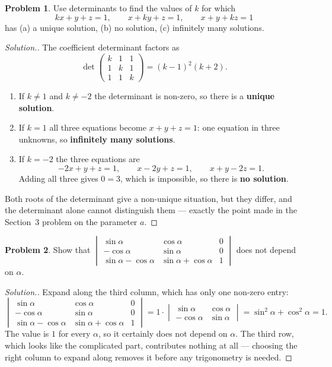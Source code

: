 \documentclass[11pt,a4paper]{article}
\theoremstyle{definition}
\newtheorem{problemx}{Problem}[section]
\newenvironment{problem}{\begin{problemx}}{\end{problemx}}
\newenvironment{solution}
  {\renewcommand{\qedsymbol}{}\begin{proof}[\textit{Solution}.]}
  {\end{proof}}
\begin{document}
\begin{problem}
Use determinants to find the values of $k$ for which
$$kx+y+z=1,\qquad x+ky+z=1,\qquad x+y+kz=1$$
has (a) a unique solution, (b) no solution, (c) infinitely many solutions.
\end{problem}
\begin{solution}
The coefficient determinant factors as
$$\det\begin{pmatrix}k&1&1\\1&k&1\\1&1&k\end{pmatrix}=(k-1)^2(k+2).$$
\begin{enumerate}
\item[(a)] If $k\neq 1$ and $k\neq -2$ the determinant is non-zero, so there is
a \textbf{unique solution}.
\item[(c)] If $k=1$ all three equations become $x+y+z=1$: one equation in three
unknowns, so \textbf{infinitely many solutions}.
\item[(b)] If $k=-2$ the three equations are
$$-2x+y+z=1,\qquad x-2y+z=1,\qquad x+y-2z=1.$$
Adding all three gives $0=3$, which is impossible, so there is \textbf{no
solution}.
\end{enumerate}
Both roots of the determinant give a non-unique situation, but they differ, and
the determinant alone cannot distinguish them --- exactly the point made in the
Section~3 problem on the parameter $a$.
\end{solution}

\begin{problem}
Show that
$\begin{vmatrix}\sin\alpha&\cos\alpha&0\\-\cos\alpha&\sin\alpha&0\\
\sin\alpha-\cos\alpha&\sin\alpha+\cos\alpha&1\end{vmatrix}$
does not depend on $\alpha$.
\end{problem}
\begin{solution}
Expand along the third column, which has only one non-zero entry:
$$\begin{vmatrix}\sin\alpha&\cos\alpha&0\\-\cos\alpha&\sin\alpha&0\\
\sin\alpha-\cos\alpha&\sin\alpha+\cos\alpha&1\end{vmatrix}
=1\cdot\begin{vmatrix}\sin\alpha&\cos\alpha\\-\cos\alpha&\sin\alpha\end{vmatrix}
=\sin^2\alpha+\cos^2\alpha=1.$$
The value is $1$ for every $\alpha$, so it certainly does not depend on
$\alpha$. The third row, which looks like the complicated part, contributes
nothing at all --- choosing the right column to expand along removes it before
any trigonometry is needed.
\end{solution}
\end{document}
